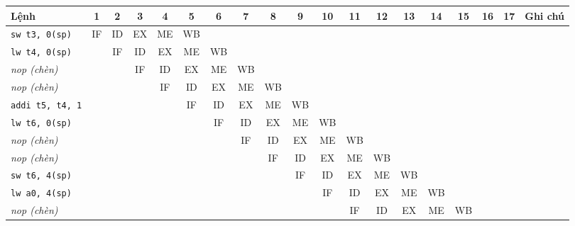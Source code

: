 \begin{tabular}{@{}lcccccccccccccccccl@{}}
\toprule
Lệnh & 1 & 2 & 3 & 4 & 5 & 6 & 7 & 8 & 9 & 10 & 11 & 12 & 13 & 14 & 15 & 16 & 17 & Ghi chú \\
\midrule
\texttt{sw t3, 0(sp)} & \cellcolor{cIF}\tiny IF & \cellcolor{cID}\tiny ID & \cellcolor{cEX}\tiny EX & \cellcolor{cME}\tiny ME & \cellcolor{cWB}\tiny WB &  &  &  &  &  &  &  &  &  &  &  &  &  \\
\texttt{lw t4, 0(sp)} &  & \cellcolor{cIF}\tiny IF & \cellcolor{cID}\tiny ID & \cellcolor{cEX}\tiny EX & \cellcolor{cME}\tiny ME & \cellcolor{cWB}\tiny WB &  &  &  &  &  &  &  &  &  &  &  &  \\
\textit{nop (chèn)} &  &  & \cellcolor{cIF}\tiny IF & \cellcolor{cID}\tiny ID & \cellcolor{cEX}\tiny EX & \cellcolor{cME}\tiny ME & \cellcolor{cWB}\tiny WB &  &  &  &  &  &  &  &  &  &  &  \\
\textit{nop (chèn)} &  &  &  & \cellcolor{cIF}\tiny IF & \cellcolor{cID}\tiny ID & \cellcolor{cEX}\tiny EX & \cellcolor{cME}\tiny ME & \cellcolor{cWB}\tiny WB &  &  &  &  &  &  &  &  &  &  \\
\texttt{addi t5, t4, 1} &  &  &  &  & \cellcolor{cIF}\tiny IF & \cellcolor{cID}\tiny ID & \cellcolor{cEX}\tiny EX & \cellcolor{cME}\tiny ME & \cellcolor{cWB}\tiny WB &  &  &  &  &  &  &  &  &  \\
\texttt{lw t6, 0(sp)} &  &  &  &  &  & \cellcolor{cIF}\tiny IF & \cellcolor{cID}\tiny ID & \cellcolor{cEX}\tiny EX & \cellcolor{cME}\tiny ME & \cellcolor{cWB}\tiny WB &  &  &  &  &  &  &  &  \\
\textit{nop (chèn)} &  &  &  &  &  &  & \cellcolor{cIF}\tiny IF & \cellcolor{cID}\tiny ID & \cellcolor{cEX}\tiny EX & \cellcolor{cME}\tiny ME & \cellcolor{cWB}\tiny WB &  &  &  &  &  &  &  \\
\textit{nop (chèn)} &  &  &  &  &  &  &  & \cellcolor{cIF}\tiny IF & \cellcolor{cID}\tiny ID & \cellcolor{cEX}\tiny EX & \cellcolor{cME}\tiny ME & \cellcolor{cWB}\tiny WB &  &  &  &  &  &  \\
\texttt{sw t6, 4(sp)} &  &  &  &  &  &  &  &  & \cellcolor{cIF}\tiny IF & \cellcolor{cID}\tiny ID & \cellcolor{cEX}\tiny EX & \cellcolor{cME}\tiny ME & \cellcolor{cWB}\tiny WB &  &  &  &  &  \\
\texttt{lw a0, 4(sp)} &  &  &  &  &  &  &  &  &  & \cellcolor{cIF}\tiny IF & \cellcolor{cID}\tiny ID & \cellcolor{cEX}\tiny EX & \cellcolor{cME}\tiny ME & \cellcolor{cWB}\tiny WB &  &  &  &  \\
\textit{nop (chèn)} &  &  &  &  &  &  &  &  &  &  & \cellcolor{cIF}\tiny IF & \cellcolor{cID}\tiny ID & \cellcolor{cEX}\tiny EX & \cellcolor{cME}\tiny ME & \cellcolor{cWB}\tiny WB &  &  &  \\

\end{tabular}
